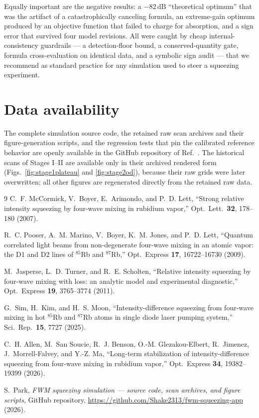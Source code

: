 \documentclass[11pt,a4paper]{article}
\newcommand{\dB}{\,\mathrm{dB}}
\begin{document}
Equally important are the negative results: a $-82\dB$ ``theoretical
optimum'' that was the artifact of a catastrophically canceling formula, an
extreme-gain optimum produced by an objective function that failed to charge
for absorption, and a sign error that survived four model revisions. All were caught by cheap
internal-consistency guardrails --- a detection-floor bound, a
conserved-quantity gate, formula cross-evaluation on identical data, and a
symbolic sign audit --- that we recommend as standard practice for any
simulation used to steer a squeezing experiment.

\section*{Data availability}
The complete simulation source code, the retained raw scan archives and their
figure-generation scripts, and the regression tests that pin the calibrated
reference behavior are openly available in the GitHub repository of
Ref.~\cite{repo}. The historical scans of Stages I--II are available only in
their archived rendered form (Figs.~\ref{fig:stage1plateau} and
\ref{fig:stage2od}), because their raw grids were later overwritten; all other
figures are regenerated directly from the retained raw data.

\begin{thebibliography}{9}
C.~F. McCormick, V.~Boyer, E.~Arimondo, and P.~D. Lett,
``Strong relative intensity squeezing by four-wave mixing in rubidium
vapor,'' Opt.\ Lett.\ \textbf{32}, 178--180 (2007).

R.~C. Pooser, A.~M. Marino, V.~Boyer, K.~M. Jones, and P.~D. Lett,
``Quantum correlated light beams from non-degenerate four-wave mixing in an
atomic vapor: the D1 and D2 lines of $^{85}$Rb and $^{87}$Rb,''
Opt.\ Express \textbf{17}, 16722--16730 (2009).

M.~Jasperse, L.~D. Turner, and R.~E. Scholten,
``Relative intensity squeezing by four-wave mixing with loss: an analytic
model and experimental diagnostic,''
Opt.\ Express \textbf{19}, 3765--3774 (2011).

G.~Sim, H.~Kim, and H.~S. Moon,
``Intensity-difference squeezing from four-wave mixing in hot $^{85}$Rb and
$^{87}$Rb atoms in single diode laser pumping system,''
Sci.\ Rep.\ \textbf{15}, 7727 (2025).

C.~H. Allen, M.~San Soucie, R.~J. Benson, O.-M. Glezakou-Elbert,
R.~Jimenez, J.~Morrell-Falvey, and Y.-Z. Ma,
``Long-term stabilization of intensity-difference squeezing from four-wave
mixing in rubidium vapor,''
Opt.\ Express \textbf{34}, 19382--19399 (2026).

S.~Park, \emph{FWM squeezing simulation --- source code, scan archives, and
figure scripts}, GitHub repository,
\url{https://github.com/Shake2313/fwm-squeezing-app} (2026).

\end{thebibliography}
\end{document}
